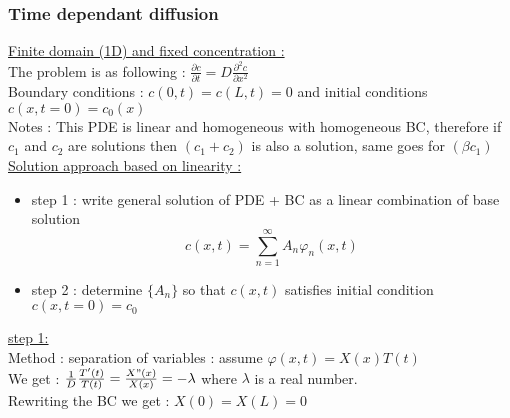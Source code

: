 \documentclass[../main.tex]{subfiles}
\begin{document}
\subsubsection{Time dependant diffusion}
\quad \underline{Finite domain (1D) and fixed concentration :}\\
The problem is as following : $\frac{\partial c}{\partial t} = D \frac{\partial^2 c}{\partial x^2}$\\
Boundary conditions : $c(0,t) = c(L,t) = 0$ and initial conditions $c(x,t=0) = c_0(x)$\\

\color{gray}Notes : This PDE is linear and homogeneous with homogeneous BC, therefore if $c_1$ and $c_2$ are solutions then $(c_1+c_2)$ is also a solution, same goes for $(\beta c_1)$\color{black}\\

\underline{Solution approach based on linearity :}\\
\begin{itemize}
    \item step 1 : write general solution of PDE + BC as a linear combination of base solution\\
    \begin{equation}
        c(x,t) = \sum_{n=1}^\infty A_n \varphi_n(x,t)
    \end{equation}
    \item step 2 : determine $\{A_n\}$ so that $c(x,t)$ satisfies initial condition $c(x,t=0)=c_0$\\
\end{itemize}

\underline{step 1:}\\
Method : separation of variables : assume $\varphi(x,t) = X(x)T(t)$\\
We get : $\frac{1}{D} \frac{T'(t)}{T(t)} = \frac{X"(x)}{X(x)} = -\lambda$ where $\lambda$ is a real number.\\
Rewriting the BC we get : $X(0) = X(L)= 0$\\
\end{document}
